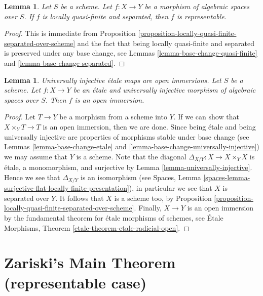 \documentclass{stacks-project}
\newenvironment{slogan}{\comment}{\endcomment}
\theoremstyle{plain}
\newtheorem{lemma}[subsection]{Lemma}
\theoremstyle{definition}
\theoremstyle{remark}
\numberwithin{equation}{subsection}
\begin{document}
\begin{lemma}
\label{lemma-locally-quasi-finite-separated-representable}
Let $S$ be a scheme. Let $f : X \to Y$ be a morphism of algebraic
spaces over $S$. If $f$ is locally quasi-finite and separated, then
$f$ is representable.
\end{lemma}

\begin{proof}
This is immediate from
Proposition \ref{proposition-locally-quasi-finite-separated-over-scheme}
and the fact that being locally quasi-finite and separated is
preserved under any base change, see
Lemmas \ref{lemma-base-change-quasi-finite} and
\ref{lemma-base-change-separated}.
\end{proof}

\begin{lemma}
\label{lemma-etale-universally-injective-open}
\begin{slogan}
Universally injective \'etale maps are open immersions.
\end{slogan}
Let $S$ be a scheme. Let $f : X \to Y$ be an \'etale and universally
injective morphism of algebraic spaces over $S$. Then $f$ is an open
immersion.
\end{lemma}

\begin{proof}
Let $T \to Y$ be a morphism from a scheme into $Y$.
If we can show that $X \times_Y T \to T$ is an open immersion, then we
are done. Since being \'etale and being universally injective are
properties of morphisms stable under base change (see
Lemmas \ref{lemma-base-change-etale} and
\ref{lemma-base-change-universally-injective})
we may assume that $Y$ is a scheme. Note that the
diagonal $\Delta_{X/Y} : X \to X \times_Y X$ is \'etale, a monomorphism, and
surjective by
Lemma \ref{lemma-universally-injective}.
Hence we see that $\Delta_{X/Y}$ is an isomorphism (see
Spaces, Lemma
\ref{spaces-lemma-surjective-flat-locally-finite-presentation}),
in particular we see that $X$ is separated over $Y$.
It follows that $X$ is a scheme too, by
Proposition \ref{proposition-locally-quasi-finite-separated-over-scheme}.
Finally, $X \to Y$ is an open immersion by the fundamental theorem
for \'etale morphisms of schemes, see
\'Etale Morphisms, Theorem \ref{etale-theorem-etale-radicial-open}.
\end{proof}



\section{Zariski's Main Theorem (representable case)}
\label{section-Zariski}
\end{document}
